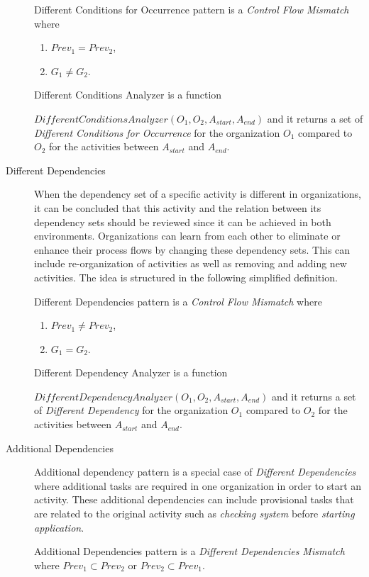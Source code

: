 \begin{description}
		\theoremstyle{definition}
		\begin{definition}
		Different Conditions for Occurrence pattern is a \textit{Control Flow Mismatch} where
		\begin{enumerate}
			\item $Prev_{1} = Prev_{2}$,
			\item $G_{1} \neq G_{2}$.
		\end{enumerate}
		\end{definition}

		\theoremstyle{definition}
		\begin{definition}
		Different Conditions Analyzer is a function 

		$DifferentConditionsAnalyzer(O_{1}, O_{2}, A_{start}, A_{end})$ and it returns a set of \textit{Different Conditions for Occurrence} for the organization $O_{1}$ compared to $O_{2}$ for the activities between $A_{start}$ and $A_{end}$.
		\end{definition}	

	\item[Different Dependencies] When the dependency set of a specific activity is different in organizations, it can be concluded that this activity and the relation between its dependency sets should be reviewed since it can be achieved in both environments. Organizations can learn from each other to eliminate or enhance their process flows by changing these dependency sets. This can include re-organization of activities as well as removing and adding new activities. The idea is structured in the following simplified definition.
		\theoremstyle{definition}
		\begin{definition}
		Different Dependencies pattern is a \textit{Control Flow Mismatch} where
		\begin{enumerate}
			\item $Prev_{1} \neq Prev_{2}$,
			\item $G_{1} = G_{2}$.
		\end{enumerate}
		\end{definition}

		\theoremstyle{definition}
		\begin{definition}
		Different Dependency Analyzer is a function 

		$DifferentDependencyAnalyzer(O_{1}, O_{2}, A_{start}, A_{end})$ and it returns a set of \textit{Different Dependency} for the organization $O_{1}$ compared to $O_{2}$ for the activities between $A_{start}$ and $A_{end}$.
		\end{definition}	
	\item[Additional Dependencies] Additional dependency pattern is a special case of \textit{Different Dependencies} where additional tasks are required in one organization in order to start an activity. These additional dependencies can include provisional tasks that are related to the original activity such as \textit{checking system} before \textit{starting application}. 
		\theoremstyle{definition}
		\begin{definition}
		Additional Dependencies pattern is a \textit{Different Dependencies Mismatch} where $Prev_{1} \subset Prev_{2}$ or $Prev_{2} \subset Prev_{1}$.
		\end{definition}


\end{description}
